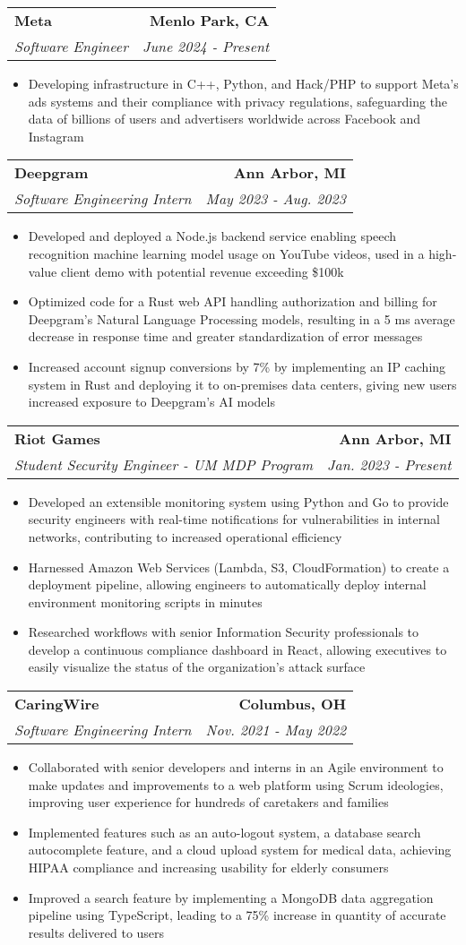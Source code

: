 \documentclass[letterpaper,11pt]{article}
\makeatletter
\newcommand{\resumeItem}[1]{
  \item\small{
    {#1 \vspace{-3pt}}
  }
}
\newcommand{\resumeSubheading}[4]{
  \vspace{-3pt}\item
    \begin{tabular*}{1.0\textwidth}[t]{l@{\extracolsep{\fill}}r}
      \textbf{#1} & \textbf{\small #2} \\
      \textit{\small#3} & \textit{\small #4} \\
    \end{tabular*}\vspace{-7pt}
}
\newcommand{\resumeItemListStart}{\begin{itemize}}
\newcommand{\resumeItemListEnd}{\end{itemize}\vspace{0pt}}
\makeatother
\begin{document}
\resumeSubheading
{Meta}{Menlo Park, CA}
{Software Engineer}{June 2024 - Present}
\resumeItemListStart
\resumeItem{Developing infrastructure in C++, Python, and Hack/PHP to support Meta's ads systems and their compliance with privacy regulations, safeguarding the data of billions of users and advertisers worldwide across Facebook and Instagram}
\resumeItemListEnd

\resumeSubheading
{Deepgram}{Ann Arbor, MI}
{Software Engineering Intern}{May 2023 - Aug. 2023}
\resumeItemListStart
\resumeItem{Developed and deployed a Node.js backend service enabling speech recognition machine learning model usage on YouTube videos, used in a high-value client demo with potential revenue exceeding \$100k}
\resumeItem{Optimized code for a Rust web API handling authorization and billing for Deepgram’s Natural Language Processing models, resulting in a 5 ms average decrease in response time and greater standardization of error messages}
\resumeItem{Increased account signup conversions by 7\% by implementing an IP caching system in Rust and deploying it to on-premises data centers, giving new users increased exposure to Deepgram’s AI models}
\resumeItemListEnd

\resumeSubheading
{Riot Games}{Ann Arbor, MI}
{Student Security Engineer - UM MDP Program}{Jan. 2023 - Present}
\resumeItemListStart
\resumeItem{Developed an extensible monitoring system using Python and Go to provide security engineers with real-time notifications for vulnerabilities in internal networks, contributing to increased operational efficiency}
\resumeItem{Harnessed Amazon Web Services (Lambda, S3, CloudFormation) to create a deployment pipeline, allowing engineers to automatically deploy internal environment monitoring scripts in minutes}
\resumeItem{Researched workflows with senior Information Security professionals to develop a continuous compliance dashboard in React, allowing executives to easily visualize the status of the organization’s attack surface}
\resumeItemListEnd

\resumeSubheading
{CaringWire}{Columbus, OH}
{Software Engineering Intern}{Nov. 2021 - May 2022}
\resumeItemListStart
\resumeItem{Collaborated with senior developers and interns in an Agile environment to make updates and improvements to a web platform using Scrum ideologies, improving user experience for hundreds of caretakers and families}
\resumeItem{Implemented features such as an auto-logout system, a database search autocomplete feature, and a cloud upload system for medical data, achieving HIPAA compliance and increasing usability for elderly consumers}
\resumeItem{Improved a search feature by implementing a MongoDB data aggregation pipeline using TypeScript, leading to a 75\% increase in quantity of accurate results delivered to users}
\resumeItemListEnd
\end{document}
